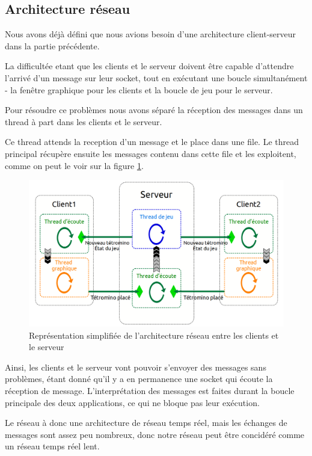 \documentclass[a4paper, 12pt]{article}
\begin{document}
		\subsection{Architecture réseau}

			Nous avons déjà défini que nous avions besoin d'une architecture client-serveur dans la partie précédente.

			La difficultée etant que les clients et le serveur doivent être capable d'attendre l'arrivé d'un message sur leur socket, tout en exécutant une boucle simultanément - la fenêtre graphique pour les clients et la boucle de jeu pour le serveur.


			Pour résoudre ce problèmes nous avons séparé la réception des messages dans un thread à part dans les clients et le serveur.

			Ce thread attends la reception d'un message et le place dans une file. Le thread principal récupère ensuite les messages contenu dans cette file et les exploitent, comme on peut le voir sur la figure \ref{fig:rezo}.

			\begin{figure}[bt]
				\centering
				\includegraphics[scale=0.35]{img/archi_reseau.png}
				\caption{Représentation simplifiée de l'architecture réseau entre les clients et le serveur}
				\label{fig:rezo}
			\end{figure}

			Ainsi, les clients et le serveur vont pouvoir s'envoyer des messages sans problèmes, étant donné qu'il y a en permanence une socket qui écoute la réception de message. L'interprétation des messages est faites durant la boucle principale des deux applications, ce qui ne bloque pas leur exécution.

			Le réseau à donc une architecture de réseau temps réel, mais les échanges de messages sont assez peu nombreux, donc notre réseau peut être concidéré comme un réseau temps réel lent.
\end{document}
